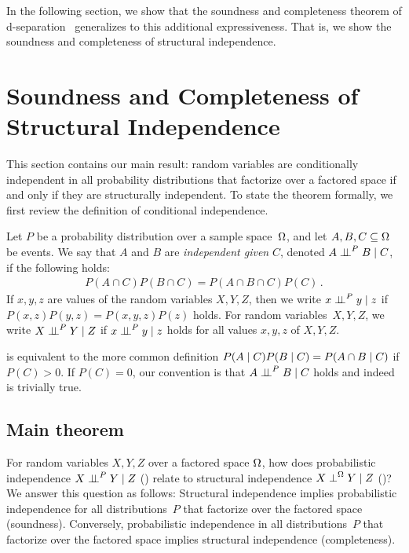 \documentclass[USenglish,onecolumn]{article}
\begin{document}
In the following section, we show that the soundness and completeness theorem of d-separation~\cite{koller2009probabilistic} generalizes to this additional expressiveness. That is, we show the soundness and completeness of structural independence.

\section{Soundness and Completeness of Structural Independence}
\label{sec:soundcomplete}


This section contains our main result: random variables are conditionally independent in all probability distributions that factorize over a factored space if and only if they are structurally independent.
To state the theorem formally, we first review the definition of conditional independence.

\begin{definition}
    \label{def:conditionalindependence} Let $P$ be a probability distribution  over a sample space~$\Omega$, and let $A,B,C\subseteq\Omega$ be events. We say that $A$ and $B$ are \emph{independent given} $C$, denoted $A\mathrel{\perp\!\!\!\perp}^P B\mid C$, if the following holds:
    \begin{align}\label{eq:conditional-independence}
      P(A\cap C)P(B\cap C)=P(A\cap B\cap C)P(C)\,.
    \end{align}
If $x,y,z$ are values of the random variables $X,Y,Z$, then we write $x\mathrel{\perp\!\!\!\perp}^P y\mid z$ if $P(x,z)P(y,z)=P(x,y,z)P(z)$ holds. For random variables~$X,Y,Z$, we write $X\mathrel{\perp\!\!\!\perp}^P Y\mid Z$ if $x\mathrel{\perp\!\!\!\perp}^P y\mid z$ holds for all values $x,y,z$ of $X,Y,Z$.
\end{definition}
 is equivalent to the more common definition $P(A\mid C)P(B\mid C)=P(A\cap B\mid C)$ if $P(C)>0$.
If $P(C)=0$, our convention is that $A\mathrel{\perp\!\!\!\perp}^P B\mid C$ holds and indeed  is trivially true.

\subsection{Main theorem}
\label{sec:theorem}
For random variables $X,Y,Z$ over a factored space $\Omega$, how does probabilistic independence $X\mathrel{\perp\!\!\!\perp}^P Y\mid Z$ () relate to structural independence $X \mathrel{\perp}^\Omega Y \mid Z$ ()?
We answer this question as follows:
Structural independence implies probabilistic independence for all distributions~$P$ that factorize over the factored space (soundness). Conversely, probabilistic independence in all distributions~$P$ that factorize over the factored space implies structural independence (completeness).
\end{document}
